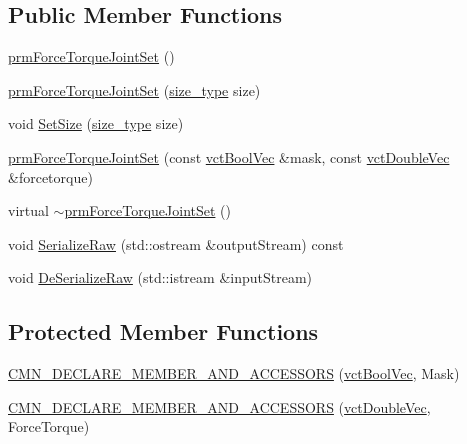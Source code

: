\subsection*{Public Member Functions}
\begin{DoxyCompactItemize}
\item 
\hyperlink{classprm_force_torque_joint_set_a5e9a84c3f2e5e0c7abc321248c3de996}{prm\+Force\+Torque\+Joint\+Set} ()
\item 
\hyperlink{classprm_force_torque_joint_set_acd4d7a0698ff15285a7c47d84cfd804e}{prm\+Force\+Torque\+Joint\+Set} (\hyperlink{classprm_force_torque_joint_set_a2fa9d363f410074de832a3f627f3b43b}{size\+\_\+type} size)
\item 
void \hyperlink{classprm_force_torque_joint_set_ac8951e030adcaafe6c9d80c4ac87d8da}{Set\+Size} (\hyperlink{classprm_force_torque_joint_set_a2fa9d363f410074de832a3f627f3b43b}{size\+\_\+type} size)
\item 
\hyperlink{classprm_force_torque_joint_set_a164f68c9bb4893fd48fa181cf3aa2e27}{prm\+Force\+Torque\+Joint\+Set} (const \hyperlink{vct_dynamic_vector_types_8h_aeb2237c134aee3769198bd9d55c8a9e0}{vct\+Bool\+Vec} \&mask, const \hyperlink{vct_dynamic_vector_types_8h_ade4b3068c86fb88f41af2e5187e491c2}{vct\+Double\+Vec} \&forcetorque)
\item 
virtual \hyperlink{classprm_force_torque_joint_set_a597372c5d1426778754af6353a36f5bd}{$\sim$prm\+Force\+Torque\+Joint\+Set} ()
\item 
void \hyperlink{classprm_force_torque_joint_set_a069781a484227e6de0465c2819e2d71b}{Serialize\+Raw} (std\+::ostream \&output\+Stream) const 
\item 
void \hyperlink{classprm_force_torque_joint_set_a1ca3cebb65848ed8cadb5117e621696b}{De\+Serialize\+Raw} (std\+::istream \&input\+Stream)
\end{DoxyCompactItemize}
\subsection*{Protected Member Functions}
\begin{DoxyCompactItemize}
\item 
\hyperlink{classprm_force_torque_joint_set_aaaeacc972d59d1c77264997e5da17d7b}{C\+M\+N\+\_\+\+D\+E\+C\+L\+A\+R\+E\+\_\+\+M\+E\+M\+B\+E\+R\+\_\+\+A\+N\+D\+\_\+\+A\+C\+C\+E\+S\+S\+O\+R\+S} (\hyperlink{vct_dynamic_vector_types_8h_aeb2237c134aee3769198bd9d55c8a9e0}{vct\+Bool\+Vec}, Mask)
\item 
\hyperlink{classprm_force_torque_joint_set_ad108954efb68dd57363d6a149de33f68}{C\+M\+N\+\_\+\+D\+E\+C\+L\+A\+R\+E\+\_\+\+M\+E\+M\+B\+E\+R\+\_\+\+A\+N\+D\+\_\+\+A\+C\+C\+E\+S\+S\+O\+R\+S} (\hyperlink{vct_dynamic_vector_types_8h_ade4b3068c86fb88f41af2e5187e491c2}{vct\+Double\+Vec}, Force\+Torque)
\end{DoxyCompactItemize}


